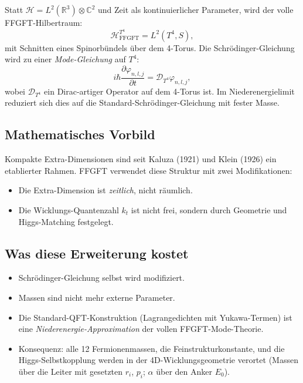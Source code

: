 Statt $\mathcal{H} = L^2(\mathbb{R}^3) \otimes \mathbb{C}^2$ und Zeit
als kontinuierlicher Parameter, wird der volle FFGFT-Hilbertraum:
\begin{equation}
  \mathcal{H}^{T^4}_{\text{FFGFT}} = L^2(T^4, S),
\end{equation}
mit Schnitten eines Spinorbündels über dem 4-Torus. Die
Schrödinger-Gleichung wird zu einer \emph{Mode-Gleichung} auf $T^4$:
\begin{equation}
  i\hbar \frac{\partial \varphi_{n,l,j}}{\partial t}
  = \mathcal{D}_{T^4} \varphi_{n,l,j},
\end{equation}
wobei $\mathcal{D}_{T^4}$ ein Dirac-artiger Operator auf dem 4-Torus
ist. Im Niederenergielimit reduziert sich dies auf die
Standard-Schrödinger-Gleichung mit fester Masse.

\subsection{Mathematisches Vorbild}

Kompakte Extra-Dimensionen sind seit Kaluza (1921) und Klein (1926)
ein etablierter Rahmen. FFGFT verwendet diese Struktur mit zwei
Modifikationen:
\begin{itemize}[leftmargin=2em,itemsep=2pt,topsep=2pt]
  \item Die Extra-Dimension ist \emph{zeitlich}, nicht räumlich.
  \item Die Wicklungs-Quantenzahl $k_t$ ist nicht frei, sondern
        durch Geometrie und Higgs-Matching festgelegt.
\end{itemize}

\subsection{Was diese Erweiterung kostet}

\begin{itemize}[leftmargin=2em,itemsep=2pt,topsep=2pt]
  \item Schrödinger-Gleichung selbst wird modifiziert.
  \item Massen sind nicht mehr externe Parameter.
  \item Die Standard-QFT-Konstruktion (Lagrangedichten mit
        Yukawa-Termen) ist eine \emph{Niederenergie-Approximation}
        der vollen FFGFT-Mode-Theorie.
  \item Konsequenz: alle 12 Fermionenmassen, die
        Feinstrukturkonstante, und die Higgs-Selbstkopplung
        werden in der 4D-Wicklungsgeometrie verortet (Massen über
        die Leiter mit gesetzten $r_i$, $p_i$; $\alpha$ über den
        Anker $E_0$).
\end{itemize}

